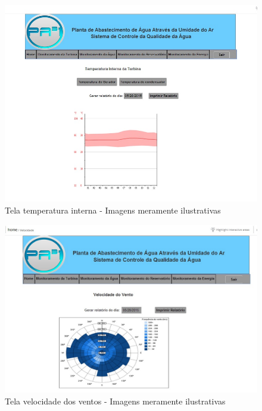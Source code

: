 \begin{center}
\begin{figure}[!ht]
\centering
\includegraphics[scale=0.7]{figuras/1}
\caption[Tela temperatura interna]{Tela temperatura interna - Imagens meramente ilustrativas}
\label{tela_temperatura_interna}
\end{figure}
\clearpage

\begin{figure}[!ht]
\centering
\includegraphics[scale=0.5]{figuras/3}
\caption[Tela velocidade dos ventos]{Tela velocidade dos ventos - Imagens meramente ilustrativas}
\label{tela_velocidade_dos_ventos}
\end{figure}
\clearpage


\end{center}
